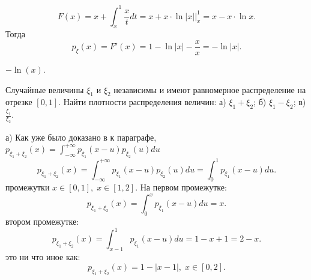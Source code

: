 \begin{solution}
\[
F(x) = x + \int_x^1 \frac{x}{t} dt = x + x \cdot \ln|x|\bigg|_x^1 = x - x \cdot  \ln x
.\] Тогда \[
p_\xi(x) = F'(x) = 1 - \ln|x| - \frac{x}{x} = - \ln|x|
.\] 
\begin{center}
\end{center}
\end{solution}

\begin{result}
$-\ln(x)$.
\end{result}

\medskip
\begin{task}{7}
  Случайные величины $\xi_1$ и $\xi_2$ независимы и имеют равномерное распределение на отрезке $\left[
  0, 1\right]$. Найти плотности распределения величин: а) $\xi_1 + \xi_2$; б) $\xi_1 - \xi_2$; в) $\frac{\xi_1}{\xi_2}$.
\end{task}

\begin{subtask}{а)}
Как уже было доказано в к параграфе, $p_{\xi_1 + \xi_2}(x) = \int_{-\infty}^{+\infty} p_{\xi_1}(x - u)
p_{\xi_2}(u) du$ 
\[
p_{\xi_1 + \xi_2}(x) = \int_{-\infty}^{+\infty} p_{\xi_1}(x - u) p_{\xi_2}(u) du = \int_0^1
p_{\xi_1}(x - u) du
.\] 
 промежутки $x \in [0, 1], \; x \in [1, 2]$. На первом промежутке: 
\[
  p_{\xi_1 + \xi_2}(x) = \int_0^x p_{\xi_1}(x - u) du = x
.\] 
 втором промежутке:
\[
p_{\xi_1 + \xi_2}(x) = \int_{x - 1}^1 p_{\xi_1}(x - u) du = 1 - x + 1 = 2 - x
.\] 
 это ни что иное как: \[
  p_{\xi_1 + \xi_2}(x) = 1 - |x - 1|, \; x \in [0, 2]
.\] 
\end{subtask}

